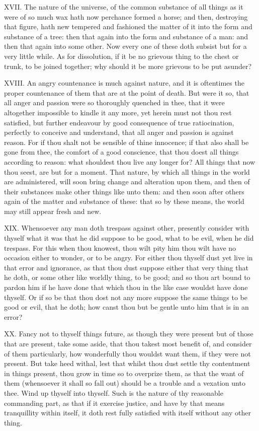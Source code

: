 XVII. The nature of the universe, of the common substance of all things
as it were of so much wax hath now perchance formed a horse; and then,
destroying that figure, hath new tempered and fashioned the matter of it
into the form and substance of a tree: then that again into the form and
substance of a man: and then that again into some other. Now every one of
these doth subsist but for a very little while. As for dissolution, if it
be no grievous thing to the chest or trunk, to be joined together; why
should it be more grievous to be put asunder?

XVIII. An angry countenance is much against nature, and it is oftentimes
the proper countenance of them that are at the point of death. But were it
so, that all anger and passion were so thoroughly quenched in thee, that
it were altogether impossible to kindle it any more, yet herein must not
thou rest satisfied, but further endeavour by good consequence of true
ratiocination, perfectly to conceive and understand, that all anger and
passion is against reason. For if thou shalt not be sensible of thine
innocence; if that also shall be gone from thee, the comfort of a good
conscience, that thou doest all things according to reason: what shouldest
thou live any longer for? All things that now thou seest, are but for a
moment. That nature, by which all things in the world are administered,
will soon bring change and alteration upon them, and then of their
substances make other things like unto them: and then soon after others
again of the matter and substance of these: that so by these means, the
world may still appear fresh and new.

XIX. Whensoever any man doth trespass against other, presently consider
with thyself what it was that he did suppose to be good, what to be evil,
when he did trespass. For this when thou knowest, thou wilt pity him thou
wilt have no occasion either to wonder, or to be angry. For either thou
thyself dust yet live in that error and ignorance, as that thou dust
suppose either that very thing that he doth, or some other like worldly
thing, to be good; and so thou art bound to pardon him if he have done
that which thou in the like case wouldst have done thyself. Or if so be
that thou dost not any more suppose the same things to be good or evil,
that he doth; how canst thou but be gentle unto him that is in an error?

XX. Fancy not to thyself things future, as though they were present
but of those that are present, take some aside, that thou takest most
benefit of, and consider of them particularly, how wonderfully thou
wouldst want them, if they were not present. But take heed withal, lest
that whilst thou dust settle thy contentment in things present, thou grow
in time so to overprize them, as that the want of them (whensoever it
shall so fall out) should be a trouble and a vexation unto thee. Wind up
thyself into thyself. Such is the nature of thy reasonable commanding
part, as that if it exercise justice, and have by that means tranquillity
within itself, it doth rest fully satisfied with itself without any other
thing.

